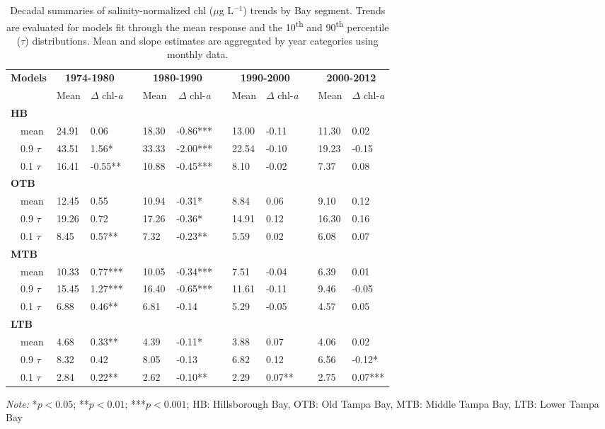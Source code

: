 \documentclass[letterpaper,12pt,oneside]{article}\usepackage{graphicx, color}
\newcommand{\mugl}{$\mu$g L$^{-1}$}
\begin{document}
%
\begin{table}[!tbp]
\caption{Decadal summaries of salinity-normalized \ac{chl} (\mugl) trends by Bay segment. Trends are evaluated for models fit through the mean response and the 10\textsuperscript{th} and 90\textsuperscript{th} percentile ($\tau$) distributions.  Mean and slope estimates are aggregated by year categories using monthly data.\label{tab:trendest}} 
\begin{center}
\begin{tabular}{lllcllcllcll}
\hline\hline
\multicolumn{1}{l}{\bfseries Models}&\multicolumn{2}{c}{\bfseries 1974-1980}&\multicolumn{1}{c}{\bfseries }&\multicolumn{2}{c}{\bfseries 1980-1990}&\multicolumn{1}{c}{\bfseries }&\multicolumn{2}{c}{\bfseries 1990-2000}&\multicolumn{1}{c}{\bfseries }&\multicolumn{2}{c}{\bfseries 2000-2012}\tabularnewline
\cline{2-3} \cline{5-6} \cline{8-9} \cline{11-12}
\multicolumn{1}{l}{}&\multicolumn{1}{c}{Mean}&\multicolumn{1}{c}{$\Delta$ chl-\textit{a}}&\multicolumn{1}{c}{}&\multicolumn{1}{c}{Mean}&\multicolumn{1}{c}{$\Delta$ chl-\textit{a}}&\multicolumn{1}{c}{}&\multicolumn{1}{c}{Mean}&\multicolumn{1}{c}{$\Delta$ chl-\textit{a}}&\multicolumn{1}{c}{}&\multicolumn{1}{c}{Mean}&\multicolumn{1}{c}{$\Delta$ chl-\textit{a}}\tabularnewline
\hline
{\bfseries HB}&&&&&&&&&&&\tabularnewline
~~mean&24.91& 0.06 &&18.30&-0.86***&&13.00&-0.11 &&11.30& 0.02 \tabularnewline
~~0.9 $\tau$&43.51& 1.56*&&33.33&-2.00***&&22.54&-0.10 &&19.23&-0.15 \tabularnewline
~~0.1 $\tau$&16.41&-0.55**&&10.88&-0.45***&& 8.10&-0.02 && 7.37& 0.08 \tabularnewline
\hline
{\bfseries OTB}&&&&&&&&&&&\tabularnewline
~~mean&12.45& 0.55 &&10.94&-0.31*&& 8.84& 0.06 && 9.10& 0.12 \tabularnewline
~~0.9 $\tau$&19.26& 0.72 &&17.26&-0.36*&&14.91& 0.12 &&16.30& 0.16 \tabularnewline
~~0.1 $\tau$& 8.45& 0.57**&& 7.32&-0.23**&& 5.59& 0.02 && 6.08& 0.07 \tabularnewline
\hline
{\bfseries MTB}&&&&&&&&&&&\tabularnewline
~~mean&10.33& 0.77***&&10.05&-0.34***&& 7.51&-0.04 && 6.39& 0.01 \tabularnewline
~~0.9 $\tau$&15.45& 1.27***&&16.40&-0.65***&&11.61&-0.11 && 9.46&-0.05 \tabularnewline
~~0.1 $\tau$& 6.88& 0.46**&& 6.81&-0.14 && 5.29&-0.05 && 4.57& 0.05 \tabularnewline
\hline
{\bfseries LTB}&&&&&&&&&&&\tabularnewline
~~mean& 4.68& 0.33**&& 4.39&-0.11*&& 3.88& 0.07 && 4.06& 0.02 \tabularnewline
~~0.9 $\tau$& 8.32& 0.42 && 8.05&-0.13 && 6.82& 0.12 && 6.56&-0.12*\tabularnewline
~~0.1 $\tau$& 2.84& 0.22**&& 2.62&-0.10**&& 2.29& 0.07**&& 2.75& 0.07***\tabularnewline
\hline
\end{tabular}
\end{center}
\footnotesize \textit{Note:} *$p<0.05$; **$p<0.01$; ***$p<0.001$; HB: Hillsborough Bay, OTB: Old Tampa Bay, MTB: Middle Tampa Bay, LTB: Lower Tampa Bay\end{table}
\end{document}
